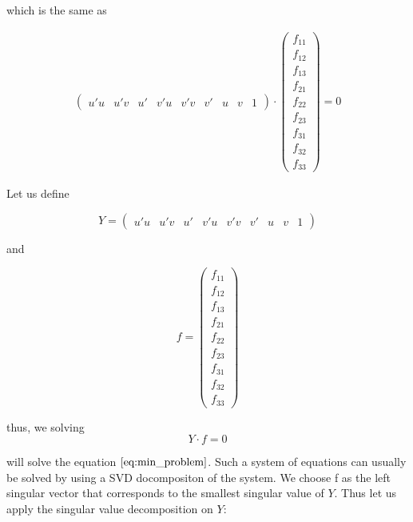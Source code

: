 \documentclass{paper}
\begin{document}
which is the same as

\begin{align*}
\left(\begin{array}{ccccccccc}
u' u & u' v & u' & v' u & v' v & v' & u & v & 1
\end{array}
\right)
\cdot
\left(\begin{array}{c}
f_{11} \\
f_{12} \\
f_{13} \\
f_{21} \\
f_{22} \\
f_{23} \\
f_{31} \\
f_{32} \\
f_{33}
\end{array}
\right)
= 0
\end{align*}

Let us define 

\begin{equation}
Y = 
\left(\begin{array}{ccccccccc}
u' u & u' v & u' & v' u & v' v & v' & u & v & 1
\end{array}
\right)
\end{equation}



and 

\begin{equation}
    f = \left(\begin{array}{c}
f_{11} \\
f_{12} \\
f_{13} \\
f_{21} \\
f_{22} \\
f_{23} \\
f_{31} \\
f_{32} \\
f_{33}
\end{array}
\right)
\end{equation}

thus, we solving 
\begin{equation}
 Y \cdot f = 0
\end{equation}

will solve the equation $\ref{eq:min_problem}$. Such a system of equations can usually be solved by using a SVD docompositon of the system. We choose f as the left singular vector that corresponds to the smallest singular value of $Y$. Thus let us apply the singular value decomposition on $Y$:
\end{document}
